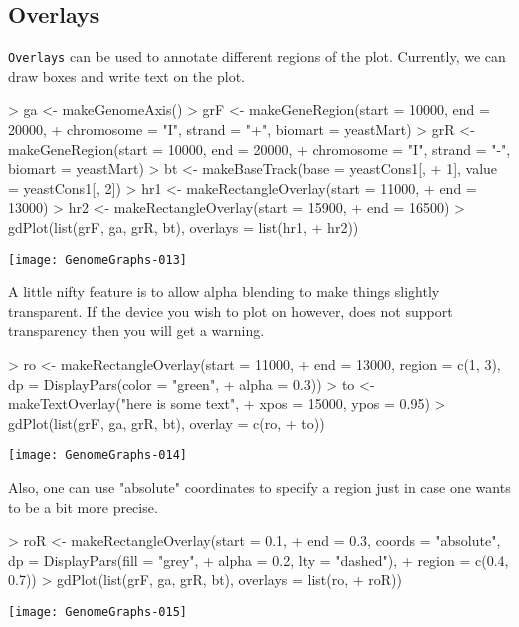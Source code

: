 \documentclass[11pt]{article}
\begin{document}
\subsection{Overlays} 
\texttt{Overlays} can be used to annotate different regions of the
plot. Currently, we can draw boxes and write text on the plot.

\begin{Schunk}
\begin{Sinput}
> ga <- makeGenomeAxis()
> grF <- makeGeneRegion(start = 10000, end = 20000, 
+     chromosome = "I", strand = "+", biomart = yeastMart)
> grR <- makeGeneRegion(start = 10000, end = 20000, 
+     chromosome = "I", strand = "-", biomart = yeastMart)
> bt <- makeBaseTrack(base = yeastCons1[, 
+     1], value = yeastCons1[, 2])
> hr1 <- makeRectangleOverlay(start = 11000, 
+     end = 13000)
> hr2 <- makeRectangleOverlay(start = 15900, 
+     end = 16500)
> gdPlot(list(grF, ga, grR, bt), overlays = list(hr1, 
+     hr2))
\end{Sinput}
\end{Schunk}
\texttt{[image: GenomeGraphs-013]}

A little nifty feature is to allow alpha blending to make things
slightly transparent. If the device you wish to plot on however, does
not support transparency then you will get a warning. 

\begin{Schunk}
\begin{Sinput}
> ro <- makeRectangleOverlay(start = 11000, 
+     end = 13000, region = c(1, 3), dp = DisplayPars(color = "green", 
+         alpha = 0.3))
> to <- makeTextOverlay("here is some text", 
+     xpos = 15000, ypos = 0.95)
> gdPlot(list(grF, ga, grR, bt), overlay = c(ro, 
+     to))
\end{Sinput}
\end{Schunk}
\texttt{[image: GenomeGraphs-014]}

Also, one can use "absolute" coordinates to specify a region just in
case one wants to be a bit more precise. 
\begin{Schunk}
\begin{Sinput}
> roR <- makeRectangleOverlay(start = 0.1, 
+     end = 0.3, coords = "absolute", dp = DisplayPars(fill = "grey", 
+         alpha = 0.2, lty = "dashed"), 
+     region = c(0.4, 0.7))
> gdPlot(list(grF, ga, grR, bt), overlays = list(ro, 
+     roR))
\end{Sinput}
\end{Schunk}
\texttt{[image: GenomeGraphs-015]}
\end{document}
